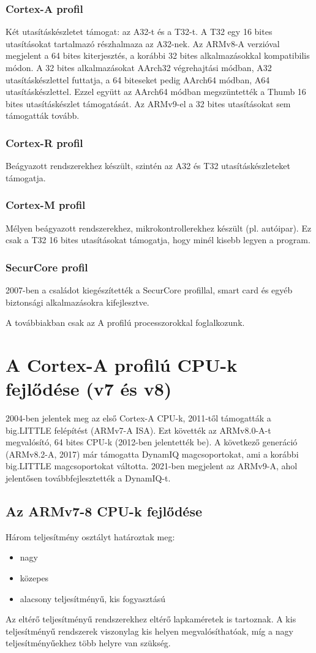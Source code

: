 \subsubsection{Cortex-A profil}
Két utasításkészletet támogat: az A32-t és a T32-t.
A T32 egy 16 bites utasításokat tartalmazó részhalmaza az A32-nek.
Az ARMv8-A verzióval megjelent a 64 bites kiterjesztés, a korábbi 32 bites alkalmazásokkal kompatibilis módon.
A 32 bites alkalmazásokat AArch32 végrehajtási módban, A32 utasításkészlettel futtatja, a 64 biteseket pedig AArch64 módban, A64 utasításkészlettel.
Ezzel együtt az AArch64 módban megszüntették a Thumb 16 bites utasításkészlet támogatását.
Az ARMv9-el a 32 bites utasításokat sem támogatták tovább.

\subsubsection{Cortex-R profil}
Beágyazott rendszerekhez készült, szintén az A32 és T32 utasításkészleteket támogatja.

\subsubsection{Cortex-M profil}
Mélyen beágyazott rendszerekhez, mikrokontrollerekhez készült (pl. autóipar).
Ez csak a T32 16 bites utasításokat támogatja, hogy minél kisebb legyen a program.

\subsubsection{SecurCore profil}
2007-ben a családot kiegészítették a SecurCore profillal, smart card és egyéb biztonsági alkalmazásokra kifejlesztve.

A továbbiakban csak az A profilú processzorokkal foglalkozunk.

\section{A Cortex-A profilú CPU-k fejlődése (v7 és v8)}
2004-ben jelentek meg az első Cortex-A CPU-k, 2011-től támogatták a big.LITTLE felépítést (ARMv7-A ISA).
Ezt követték az ARMv8.0-A-t megvalósító, 64 bites CPU-k (2012-ben jelentették be).
A következő generáció (ARMv8.2-A, 2017) már támogatta DynamIQ magcsoportokat, ami a korábbi big.LITTLE magcsoportokat váltotta.
2021-ben megjelent az ARMv9-A, ahol jelentősen továbbfejlesztették a DynamIQ-t.

\subsection{Az ARMv7-8 CPU-k fejlődése}
Három teljesítmény osztályt határoztak meg:
\begin{itemize}
    \item nagy
    \item közepes
    \item alacsony teljesítményű, kis fogyasztású
\end{itemize}
Az eltérő teljesítményű rendszerekhez eltérő lapkaméretek is tartoznak.
A kis teljesítményű rendszerek viszonylag kis helyen megvalósíthatóak, míg a nagy teljesítményűekhez több helyre van szükség.


